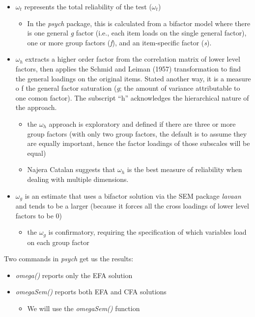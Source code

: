 \documentclass[
  english,
]{book}
\providecommand{\tightlist}{%
  \setlength{\itemsep}{0pt}\setlength{\parskip}{0pt}}
\begin{document}
\begin{itemize}
\tightlist
\item
  \(\omega_{t}\) represents the total reliability of the test (\(\omega_{t}\))

  \begin{itemize}
  \tightlist
  \item
    In the \emph{psych} package, this is calculated from a bifactor model where there is one general \emph{g} factor (i.e., each item loads on the single general factor), one or more group factors (\emph{f}), and an item-specific factor (\emph{s}).
  \end{itemize}
\item
  \(\omega_{h}\) extracts a higher order factor from the correlation matrix of lower level factors, then applies the Schmid and Leiman (1957) transformation to find the general loadings on the original items. Stated another way, it is a measure o f the general factor saturation (\emph{g}; the amount of variance attributable to one comon factor). The subscript ``h'' acknowledges the hierarchical nature of the approach.

  \begin{itemize}
  \tightlist
  \item
    the \(\omega_{h}\) approach is exploratory and defined if there are three or more group factors (with only two group factors, the default is to assume they are equally important, hence the factor loadings of those subscales will be equal)
  \item
    Najera Catalan \citep{najera_catalan_reliability_2019} suggests that \(\omega_{h}\) is the best measure of reliability when dealing with multiple dimensions.
  \end{itemize}
\item
  \(\omega_{g}\) is an estimate that uses a bifactor solution via the SEM package \emph{lavaan} and tends to be a larger (because it forces all the cross loadings of lower level factors to be 0)

  \begin{itemize}
  \tightlist
  \item
    the \(\omega_{g}\) is confirmatory, requiring the specification of which variables load on each group factor
  \end{itemize}
\end{itemize}

Two commands in \emph{psych} get us the results:

\begin{itemize}
\tightlist
\item
  \emph{omega()} reports only the EFA solution
\item
  \emph{omegaSem()} reports both EFA and CFA solutions

  \begin{itemize}
  \tightlist
  \item
    We will use the \emph{omegaSem()} function
  \end{itemize}
\end{itemize}
\end{document}
